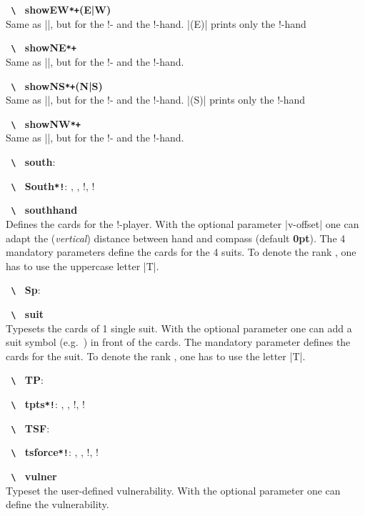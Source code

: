 \documentclass[a4paper,fontsize=11pt,%
  danish,%
  dutch,%
  french,%
  german,%
  norsk,%
  spanish,%
  swedish,%
  turkish,%
  english,%
]{scrartcl}
\newcommand\bs{%
  \texttt{%
    \upshape%
    \textbackslash%
  }%
}%
\let\olditem\item
\renewcommand\item[1][\relax]{\olditem\textbf{\bs#1}}
\newcommand\Oarg[1]{\colorbox{optbackgr}{\texttt{#1}}}
\begin{document}
\begin{description}[itemsep=-0.3em]
\DeleteShortVerb{\|}
\item[showEW\Oarg{*+}\Q{[pos]}(E|W)]\\
\MakeShortVerb{\|}
Same as |\showAll|, but for the \East*!- and the \West*!-hand. |\showEW(E)|
prints only the \East*!-hand

\item[showNE\Oarg{*+}\Q{[pos]}]\\
Same as |\showAll|, but for the \North*!- and the \East*!-hand.

\DeleteShortVerb{\|}
\item[showNS\Oarg{*+}\Q{[pos]}(N|S)]\\
\MakeShortVerb{\|}
Same as |\showAll|, but for the \North*!- and the \South*!-hand. |\showNS(S)|
prints only the \South*!-hand
\item[showNW\Oarg{*+}\Q{[pos]}]\\
Same as |\showAll|, but for the \North*!- and the \West*!-hand.

\item[south]: \south
\item[South\Oarg{*!}]: \South, \South*, \South!, \South*!

\item[southhand]\\
Defines the cards for the
\South*!-player. With the optional parameter |v-offset| one can adapt the
(\emph{vertical}) distance between hand and compass (default \textbf{0pt}).
The 4 mandatory parameters define the cards for the 4 suits. To denote the
rank , one has to use the uppercase letter |T|.

\item[Sp]: \Sp

\item[suit]\\
Typesets the cards of 1 single suit.
With the optional parameter one can add a suit symbol (e.g.\ \He) in front
of the cards. The mandatory parameter defines the cards for the suit. To
denote the rank , one has to use the letter |T|.

\item[TP]: \TP
\item[tpts\Oarg{*!}]: \tpts, \tpts*, \tpts!, \tpts*!

\item[TSF]: \TSF
\item[tsforce\Oarg{*!}]: \tsforce, \tsforce*, \tsforce!, \tsforce*!

\item[vulner\Q{[text]}]\\
Typeset the user-defined vulnerability. With the optional parameter one can
define the vulnerability.


\end{description}
\end{document}
